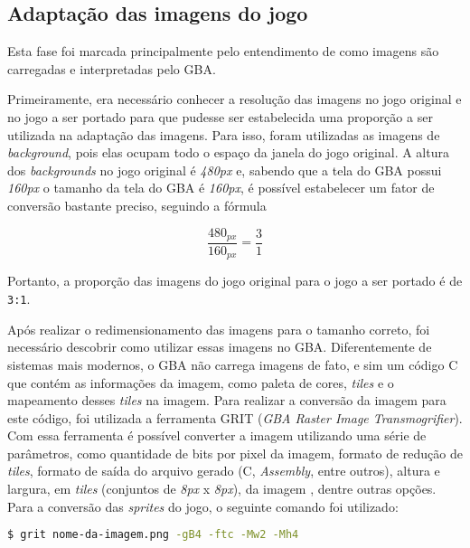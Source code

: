 \subsection{Adaptação das imagens do jogo}

Esta fase foi marcada principalmente pelo entendimento de como imagens são carregadas e interpretadas pelo GBA.

Primeiramente, era necessário conhecer a resolução das imagens no jogo original e no jogo a ser portado para que pudesse ser estabelecida uma proporção a ser utilizada na adaptação das imagens. Para isso, foram utilizadas as imagens de \textit{background}, pois elas ocupam todo o espaço da janela do jogo original. A altura dos \textit{backgrounds} no jogo original é \textit{480px} e, sabendo que a tela do GBA possui \textit{160px} o tamanho da tela do GBA é \textit{160px}, é possível estabelecer um fator de conversão bastante preciso, seguindo a fórmula

\begin{equation}
\label{Cálculo da proporção das imagens do jogo}
\frac{480_{px}}{160_{px}} = \frac{3}{1}
\end{equation}

Portanto, a proporção das imagens do jogo original para o jogo a ser portado é de \texttt{3:1}.

Após realizar o redimensionamento das imagens para o tamanho correto, foi necessário descobrir como utilizar essas imagens no GBA. Diferentemente de sistemas mais modernos, o GBA não carrega imagens de fato, e sim um código C que contém as informações da imagem, como paleta de cores, \textit{tiles} e o mapeamento desses \textit{tiles} na imagem. Para realizar a conversão da imagem para este código, foi utilizada a ferramenta GRIT (\textit{GBA Raster Image Transmogrifier}). Com essa ferramenta é possível converter a imagem utilizando uma série de parâmetros, como quantidade de bits por pixel da imagem, formato de redução de \textit{tiles}, formato de saída do arquivo gerado (C, \textit{Assembly}, entre outros), altura e largura, em \textit{tiles} (conjuntos de \textit{8px} x \textit{8px}), da imagem , dentre outras opções. Para a conversão das \textit{sprites} do jogo, o seguinte comando foi utilizado:

\begin{lstlisting}[language=bash,caption={Comando para conversão das imagens em código}]
$ grit nome-da-imagem.png -gB4 -ftc -Mw2 -Mh4
\end{lstlisting}

